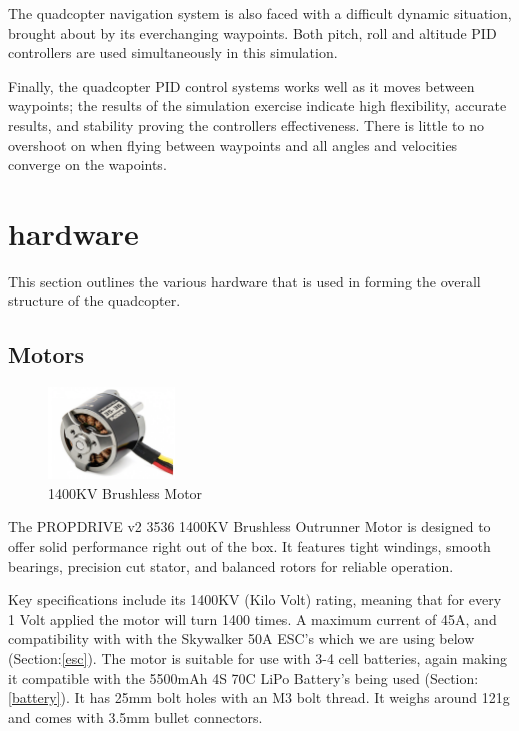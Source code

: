\documentclass{report}
\begin{document}
The quadcopter navigation system is also faced with a difficult dynamic situation, brought about by its everchanging waypoints. Both pitch, roll and altitude PID controllers are used simultaneously in this simulation. 

Finally, the quadcopter PID control systems works well as it moves between waypoints; the results of the simulation exercise indicate high flexibility, accurate results, and stability proving the controllers effectiveness. There is little to no overshoot on when flying between waypoints and all angles and velocities converge on the wapoints. 

\chapter{hardware}\label{hardware}
 This section outlines the various hardware
that is used in forming the overall structure of the quadcopter.

\section{Motors}\label{motors}
\begin{figure}[H]
  \centering
  \includegraphics[width=0.3\textwidth]{Pictures/motors.png} 
  \caption{1400KV Brushless Motor}
  \label{fig:motor}
\end{figure}
The PROPDRIVE v2 3536 1400KV Brushless Outrunner Motor is designed to offer
solid performance right out of the box. It features tight windings, smooth
bearings, precision cut stator, and balanced rotors for reliable operation.

Key specifications include its 1400KV (Kilo Volt) rating, meaning that for every
1 Volt applied the motor will turn 1400 times. A maximum current of 45A, and
compatibility with with the Skywalker 50A ESC's which we are using below
(Section:\ref{esc}). The motor is suitable for use with 3-4 cell batteries,
again making it compatible with the 5500mAh 4S 70C LiPo Battery's being used
(Section:\ref{battery}). It has 25mm bolt holes with an M3 bolt thread. It
weighs around 121g and comes with 3.5mm bullet connectors.
\end{document}
